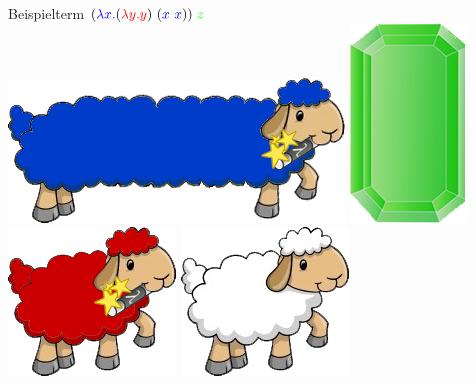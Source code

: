 \documentclass[18pt]{beamer}
\begin{document}
\begin{frame}{Beispielterm}
	$(\textcolor{blue}{\lambda x. } (\textcolor{red}{\lambda y. y}) \ (\textcolor{blue}{x \ x})) \ \textcolor{green}{z}$ \\
	\vspace{0.3cm}
	\includegraphics[scale=1.8]{pictures/lamb_long_blue} \hspace{0.8cm}  \includegraphics[scale=0.5]{pictures/gem_green} \\
	\vspace{0.3cm}
	\includegraphics[scale=1.7]{pictures/lamb_red} \hspace{0.1cm} \includegraphics[scale=1.7]{pictures/lamb_white}\\
	\vspace{0.3cm}

\end{frame}
\end{document}
